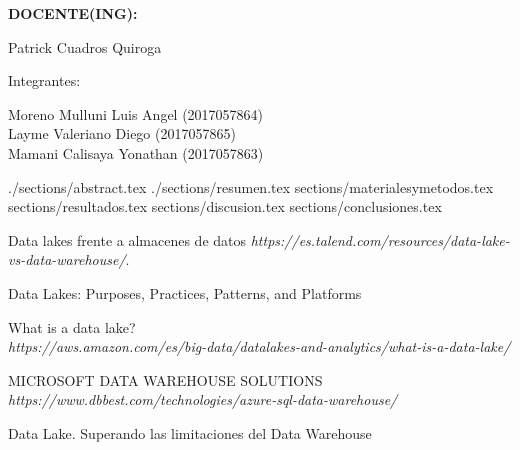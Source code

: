 \documentclass[12pt,letterpaper]{article}
\begin{document}
\begin{titlepage}
\begin{center}
\vspace*{0.3in}
\begin{Large}
\textbf{DOCENTE(ING):} \\
\end{Large}

\vspace*{0.1in}
\begin{large}
 Patrick Cuadros Quiroga\\
\end{large}

\vspace*{0.2in}
\vspace*{0.1in}
\begin{large}
Integrantes: \\
\begin{flushleft}
Moreno Mulluni Luis Angel		\hfill	(2017057864) \\
Layme Valeriano Diego 		\hfill	(2017057865) \\
Mamani Calisaya Yonathan 	           	\hfill	(2017057863) \\
\end{flushleft}
\end{large}
\end{center}

\end{titlepage}


\tableofcontents %
\thispagestyle{empty} %
\newpage
\setcounter{page}{1} %

 {./sections/abstract.tex}
 {./sections/resumen.tex}
 {sections/materialesymetodos.tex}
 {sections/resultados.tex}
 {sections/discusion.tex}
 {sections/conclusiones.tex}

\begin{thebibliography}{9}
    Data lakes frente a almacenes de datos
    \textit{https://es.talend.com/resources/data-lake-vs-data-warehouse/}. 
    
    Data Lakes: Purposes, Practices, Patterns, and Platforms
    
    What is a data lake?\\
    \textit{https://aws.amazon.com/es/big-data/datalakes-and-analytics/what-is-a-data-lake/}
    
    MICROSOFT DATA WAREHOUSE SOLUTIONS\\
    \textit{https://www.dbbest.com/technologies/azure-sql-data-warehouse/}
    
    Data Lake.
Superando las limitaciones
del Data Warehouse
    
    
    
    
    
    
    


\end{thebibliography}
\end{document}
